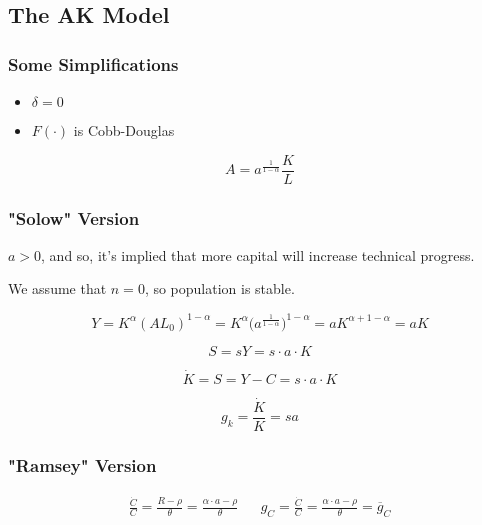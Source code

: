 \subsection{The AK Model}

\subsubsection{Some Simplifications}
\begin{itemize}
    \item $\delta=0$
    \item $F(\cdot)$ is Cobb-Douglas
\end{itemize}

\begin{equation*}
    A=a^{\frac{1}{1-\alpha}}\frac{K}{L}
\end{equation*}

\subsubsection{"Solow" Version}


$a>0$, and so, it's implied that more capital will increase technical progress. 

We assume that $n=0$, so population is stable. 

\begin{equation*}
    Y=K^\alpha(AL_{0})^{1-\alpha}=K^\alpha\bigg(a^{\frac{1}{1-\alpha}}\bigg)^{1-\alpha}=aK^{\alpha+1-\alpha}=aK
\end{equation*}

\begin{equation*}
    S=sY=s\cdot a \cdot K
\end{equation*}

\begin{equation*}
    \Dot{K}=S=Y-C=s \cdot a \cdot K
\end{equation*}

\begin{equation*}
    g_{k}=\frac{\Dot{K}}{K}=sa
\end{equation*}

\subsubsection{"Ramsey" Version}

\begin{align*}
    \frac { \dot{C}} { C } = \frac { R - \rho } { \theta }=\frac{\alpha \cdot a - \rho}{\theta} && 
    g_{C}=\frac{\dot{C}}{C}=\frac{\alpha \cdot a -\rho}{\theta}=\overline{g}_{C}
\end{align*}

